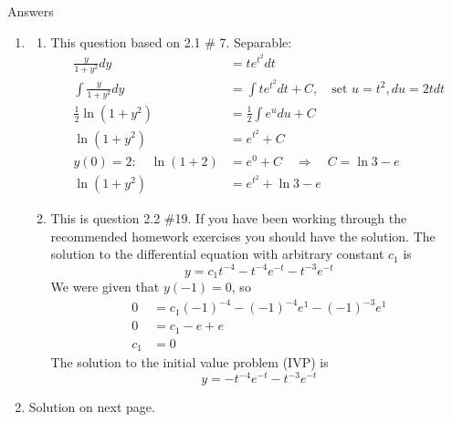 \documentclass[12pt]{exam}
\begin{document}
\newpage

\large{Answers}

\begin{enumerate}
    \item 
    \begin{enumerate}
        \item This question based on 2.1 \# 7. Separable: 
    \begin{align*}
        \frac{y}{1+y^2} dy &= te^{t^2} dt \\
        \int \frac{y}{1+y^2} dy &= \int te^{t^2} dt + C, \quad \text{set } u = t^2, du = 2t dt \\
        \frac12 \ln (1+y^2) &= \frac12 \int e^u du + C \\
         \ln (1+y^2) &= e^{t^2} + C \\
        y(0) = 2: \quad \ln (1 + 2) &= e^0 + C \quad \Rightarrow \quad C = \ln 3 - e \\
        \ln( 1 + y^2) &= e^{t^2} + \ln 3 - e
    \end{align*}
    \item This is question 2.2 \#19. If you have been working through the recommended homework exercises you should have the solution. The solution to the differential equation with arbitrary constant $c_1$ is $$y = c_1t^{-4} - t^{-4} e^{-t} - t^{-3}e^{-t}$$
    We were given that $y(-1) = 0$, so
    \begin{align*}
        0 &= c_1(-1)^{-4} - (-1)^{-4} e^{1} - (-1)^{-3}e^{1} \\
        0 &= c_1 - e + e \\
        c_1 &= 0
    \end{align*}
    The solution to the initial value problem (IVP) is
    $$y = - t^{-4} e^{-t} - t^{-3}e^{-t}$$
    
    \end{enumerate}
    \item Solution on next page. 
    

\end{enumerate}
\end{document}
